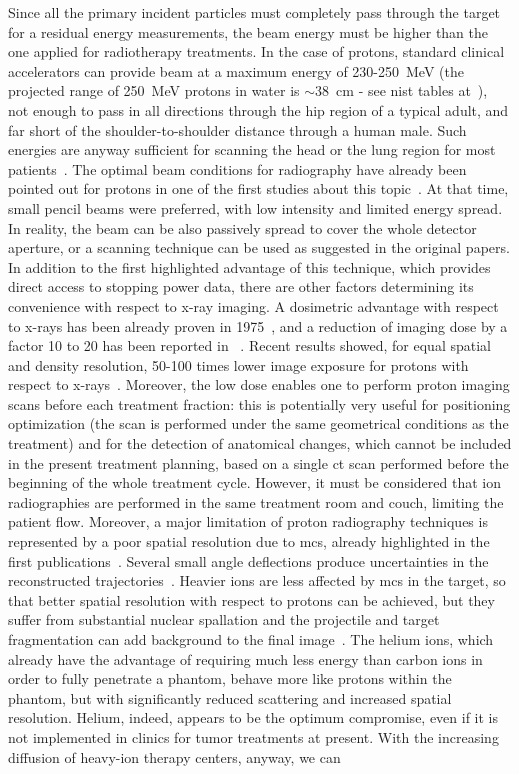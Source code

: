Since all the primary incident particles must completely pass through the target for a residual energy measurements, the beam energy must be higher than the one applied for radiotherapy treatments. In the case of protons, standard clinical accelerators can provide beam at a maximum energy of 230-250~MeV (the projected range of 250~MeV protons in water is $\sim$38~cm - see \gls{nist} tables at~\cite{NISTpstar}), not enough to pass in all directions through the hip region of a typical adult, and far short of the shoulder-to-shoulder distance through a human male. Such energies are anyway sufficient for scanning the head or the lung region for most patients~\parencite{Johnson2017}. The optimal beam conditions for radiography have already been pointed out for protons in one of the first studies about this topic~\parencite{Moffett1975}. At that time, small pencil beams were preferred, with low intensity and limited energy spread. In reality, the beam can be also passively spread to cover the whole detector aperture, or a scanning technique can be used as suggested in the original papers. In addition to the first highlighted advantage of this technique, which provides direct access to stopping power data, there are other factors determining its convenience with respect to x-ray imaging. A dosimetric advantage with respect to x-rays has been already proven in 1975~\parencite{Moffett1975}, and a reduction of imaging dose by a factor 10 to 20 has been reported in ~\cite{Schneider1995}. Recent results showed, for equal spatial and density resolution, 50-100 times lower image exposure for protons with respect to x-rays~\parencite{Schneider2004}. Moreover, the low dose enables one to perform proton imaging scans before each treatment fraction: this is potentially very useful for positioning optimization (the scan is performed under the same geometrical conditions as the treatment) and for the detection of anatomical changes, which cannot be included in the present treatment planning, based on a single \gls{ct} scan performed before the beginning of the whole treatment cycle. However, it must be considered that ion radiographies are performed in the same treatment room and couch, limiting the patient flow. Moreover, a major limitation of proton radiography techniques is represented by a poor spatial resolution due to \gls{mcs}, already highlighted in the first publications~\parencite{Koehler1968, Moffett1975}. Several small angle deflections produce uncertainties in the reconstructed trajectories~\parencite{Schneider1995, Schneider2004, Penfold2009}. Heavier ions are less affected by \gls{mcs} in the target, so that better spatial resolution with respect to protons can be achieved, but they suffer from substantial nuclear spallation and the projectile and target fragmentation can add background to the final image~\parencite{Parodi2014}. The helium ions, which already have the advantage of requiring much less energy than carbon ions in order to fully penetrate a phantom, behave more like protons within the phantom, but with significantly reduced scattering and increased spatial resolution. Helium, indeed, appears to be the optimum compromise, even if it is not implemented in clinics for tumor treatments at present. With the increasing diffusion of heavy-ion therapy centers, anyway, we can 